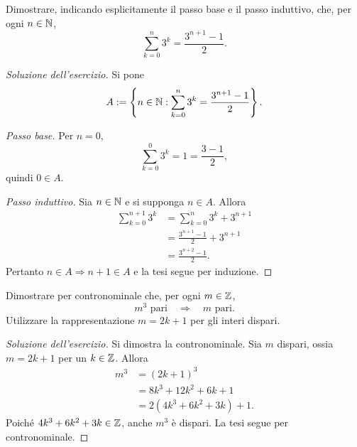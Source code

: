 \begin{exercise}
\label{ex:fondamenti-somma-geometrica-ragione-tre}
Dimostrare, indicando esplicitamente il passo base e il passo induttivo,
che, per ogni $n\in\mathbb{N}$,
\[
  \sum_{k=0}^{n}3^k=\frac{3^{n+1}-1}{2}.
\]
\end{exercise}
\begin{proof}[Soluzione dell'esercizio]
Si pone
\[
  A:=\left\{n\in\mathbb{N}:\sum_{k=0}^{n}3^k=\frac{3^{n+1}-1}{2}\right\}.
\]

\emph{Passo base.} Per $n=0$,
\[
  \sum_{k=0}^{0}3^k=1=\frac{3-1}{2},
\]
quindi $0\in A$.

\emph{Passo induttivo.} Sia $n\in\mathbb{N}$ e si supponga $n\in A$. Allora
\[
\begin{aligned}
  \sum_{k=0}^{n+1}3^k
    &=\sum_{k=0}^{n}3^k+3^{n+1}\\
    &=\frac{3^{n+1}-1}{2}+3^{n+1}\\
    &=\frac{3^{n+2}-1}{2}.
\end{aligned}
\]
Pertanto $n\in A\Rightarrow n+1\in A$ e la tesi segue per induzione.
\end{proof}

\clearpage

\begin{exercise}
\label{ex:fondamenti-parita-del-cubo}
Dimostrare per contronominale che, per ogni $m\in\mathbb{Z}$,
\[
  m^3\text{ pari}\quad\Longrightarrow\quad m\text{ pari}.
\]
Utilizzare la rappresentazione $m=2k+1$ per gli interi dispari.
\end{exercise}
\begin{proof}[Soluzione dell'esercizio]
Si dimostra la contronominale. Sia $m$ dispari, ossia
$m=2k+1$ per un $k\in\mathbb{Z}$. Allora
\[
\begin{aligned}
  m^3&=(2k+1)^3\\
     &=8k^3+12k^2+6k+1\\
     &=2(4k^3+6k^2+3k)+1.
\end{aligned}
\]
Poiché $4k^3+6k^2+3k\in\mathbb{Z}$, anche $m^3$ è dispari.
La tesi segue per contronominale.
\end{proof}

